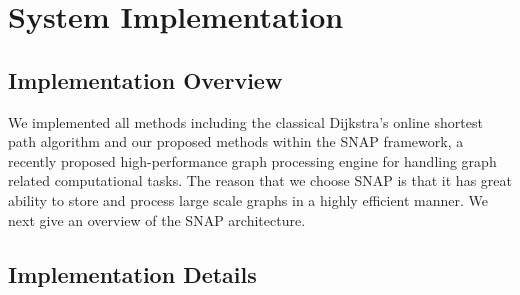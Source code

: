 \section{System Implementation}
\label{implementation}

\subsection{Implementation Overview}

We implemented all methods including the classical Dijkstra's online shortest path algorithm and our proposed methods within the SNAP framework, a recently proposed high-performance graph processing engine for handling graph related computational tasks. The reason that we choose SNAP is that it has great ability to store and process large scale graphs in a highly efficient manner. We next give an overview of the SNAP architecture.

\subsection{Implementation Details}

